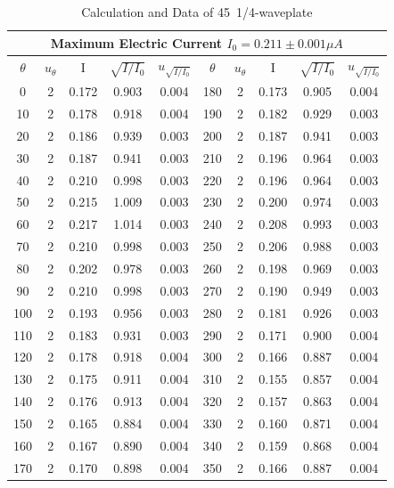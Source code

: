 \documentclass[12pt,a4paper]{article}
\begin{document}
\begin{table}[H]
    \centering
    \begin{tabular}{|c|c|c|c|c|c|c|c|c|c|}
    \hline
    \multicolumn{10}{|c|}{Maximum Electric Current $I_0=0.211\pm0.001\mu A$}      \\ \hline
    $\theta$ & $u_\theta$ &I& $\sqrt{I/I_0}$ & $u_{\sqrt{I/I_0}}$ &$\theta$ & $u_\theta$ &I& $\sqrt{I/I_0}$ & $u_{\sqrt{I/I_0}}$     \\ \hline
    0     & 2 & 0.172 & 0.903 & 0.004 & 180   & 2 & 0.173 & 0.905 & 0.004 \\ \hline
    10    & 2 & 0.178 & 0.918 & 0.004 & 190   & 2 & 0.182 & 0.929 & 0.003 \\ \hline
    20    & 2 & 0.186 & 0.939 & 0.003 & 200   & 2 & 0.187 & 0.941 & 0.003 \\ \hline
    30    & 2 & 0.187 & 0.941 & 0.003 & 210   & 2 & 0.196 & 0.964 & 0.003 \\ \hline
    40    & 2 & 0.210  & 0.998 & 0.003 & 220   & 2 & 0.196 & 0.964 & 0.003 \\ \hline
    50    & 2 & 0.215 & 1.009 & 0.003 & 230   & 2 & 0.200   & 0.974 & 0.003 \\ \hline
    60    & 2 & 0.217 & 1.014 & 0.003 & 240   & 2 & 0.208 & 0.993 & 0.003 \\ \hline
    70    & 2 & 0.210  & 0.998 & 0.003 & 250   & 2 & 0.206 & 0.988 & 0.003 \\ \hline
    80    & 2 & 0.202 & 0.978 & 0.003 & 260   & 2 & 0.198 & 0.969 & 0.003 \\ \hline
    90    & 2 & 0.210  & 0.998 & 0.003 & 270   & 2 & 0.190  & 0.949 & 0.003 \\ \hline
    100   & 2 & 0.193 & 0.956 & 0.003 & 280   & 2 & 0.181 & 0.926 & 0.003 \\ \hline
    110   & 2 & 0.183 & 0.931 & 0.003 & 290   & 2 & 0.171 & 0.900 & 0.004 \\ \hline
    120   & 2 & 0.178 & 0.918 & 0.004 & 300   & 2 & 0.166 & 0.887 & 0.004 \\ \hline
    130   & 2 & 0.175 & 0.911 & 0.004 & 310   & 2 & 0.155 & 0.857 & 0.004 \\ \hline
    140   & 2 & 0.176 & 0.913 & 0.004 & 320   & 2 & 0.157 & 0.863 & 0.004 \\ \hline
    150   & 2 & 0.165 & 0.884 & 0.004 & 330   & 2 & 0.160  & 0.871 & 0.004 \\ \hline
    160   & 2 & 0.167 & 0.890 & 0.004 & 340   & 2 & 0.159 & 0.868 & 0.004 \\ \hline
    170   & 2 & 0.170  & 0.898 & 0.004 & 350   & 2 & 0.166 & 0.887 & 0.004 \\ \hline
    \end{tabular}
    \caption{Calculation and Data of 45\degree~1/4-waveplate}
    \label{45degree}
\end{table}
\end{document}
